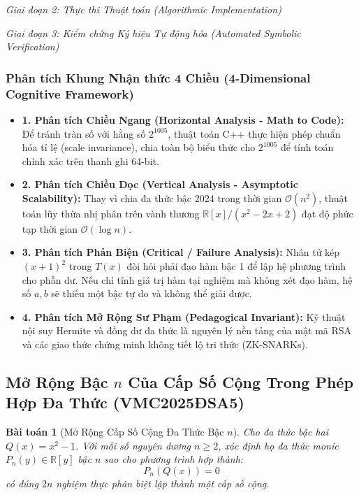 \documentclass{article}
\newtheorem{baitoan}{Bài toán}
\begin{document}
\vspace{0.5em}\noindent\emph{Giai đoạn 2: Thực thi Thuật toán (Algorithmic Implementation)}


\vspace{0.5em}\noindent\emph{Giai đoạn 3: Kiểm chứng Ký hiệu Tự động hóa (Automated Symbolic Verification)}


\subsubsection*{Phân tích Khung Nhận thức 4 Chiều (4-Dimensional Cognitive Framework)}
\begin{itemize}
    \item \textbf{1. Phân tích Chiều Ngang (Horizontal Analysis - Math to Code):} Để tránh tràn số với hằng số $2^{1005}$, thuật toán C++ thực hiện phép chuẩn hóa tỉ lệ (scale invariance), chia toàn bộ biểu thức cho $2^{1005}$ để tính toán chính xác trên thanh ghi 64-bit.
    \item \textbf{2. Phân tích Chiều Dọc (Vertical Analysis - Asymptotic Scalability):} Thay vì chia đa thức bậc 2024 trong thời gian $\mathcal{O}(n^2)$, thuật toán lũy thừa nhị phân trên vành thương $\mathbb{R}[x]/(x^2-2x+2)$ đạt độ phức tạp thời gian $\mathcal{O}(\log n)$.
    \item \textbf{3. Phân tích Phản Biện (Critical / Failure Analysis):} Nhân tử kép $(x+1)^2$ trong $T(x)$ đòi hỏi phải đạo hàm bậc 1 để lập hệ phương trình cho phần dư. Nếu chỉ tính giá trị hàm tại nghiệm mà không xét đạo hàm, hệ số $a, b$ sẽ thiếu một bậc tự do và không thể giải được.
    \item \textbf{4. Phân tích Mở Rộng Sư Phạm (Pedagogical Invariant):} Kỹ thuật nội suy Hermite và đồng dư đa thức là nguyên lý nền tảng của mật mã RSA và các giao thức chứng minh không tiết lộ tri thức (ZK-SNARKs).
\end{itemize}



\subsection{Mở Rộng Bậc $n$ Của Cấp Số Cộng Trong Phép Hợp Đa Thức (VMC2025ĐSA5)}

\begin{baitoan}[Mở Rộng Cấp Số Cộng Đa Thức Bậc $n$]
Cho đa thức bậc hai $Q(x) = x^2 - 1$. Với mỗi số nguyên dương $n \ge 2$, xác định họ đa thức monic $P_n(y) \in \mathbb{R}[y]$ bậc $n$ sao cho phương trình hợp thành:
\begin{equation}
    P_n(Q(x)) = 0
\end{equation}
có đúng $2n$ nghiệm thực phân biệt lập thành một cấp số cộng.
\end{baitoan}
\end{document}
